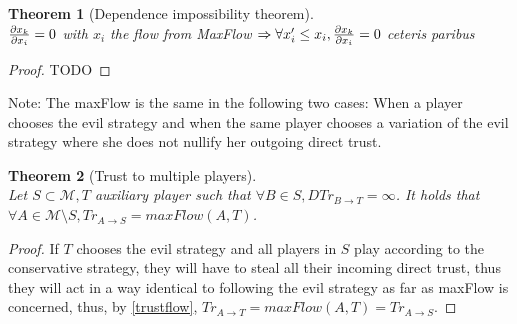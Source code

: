 \documentclass[11pt]{article}
\newtheorem{theorem}{Theorem}[section]
\theoremstyle{definition}
\theoremstyle{corollary}
\theoremstyle{lemma}
\begin{document}
    \begin{theorem}[Dependence impossibility theorem] \ \\
    \label{independence}
       ${\partial x_k \over \partial x_i} = 0$ with $x_i$ the flow from MaxFlow $\Rightarrow
         \forall x_i' \leq x_i, {\partial x_k \over \partial x_i} = 0$ ceteris paribus
    \end{theorem}
    \begin{proof}
       TODO
    \end{proof}
    Note: The maxFlow is the same in the following two cases: When a player chooses the evil strategy and when the same
    player chooses a variation of the evil strategy where she does not nullify her outgoing direct trust.
    \begin{theorem}[Trust to multiple players] \ \\
    \label{trustmany}
       Let $S \subset \mathcal{M}, T$ auxiliary player such that $\forall B \in S, DTr_{B \rightarrow T} = \infty$.
       It holds that $\forall A \in \mathcal{M} \setminus S, Tr_{A \rightarrow S} = maxFlow(A, T)$.
    \end{theorem}       
    \begin{proof}
       If $T$ chooses the evil strategy and all players in $S$ play according to the conservative strategy, they will have to steal
       all their incoming direct trust, thus they will act in a way identical to following the evil strategy as far as
       maxFlow is concerned, thus, by \ref{trustflow}, $Tr_{A \rightarrow T} = maxFlow(A, T) = Tr_{A \rightarrow S}$.
    \end{proof}
\end{document}

